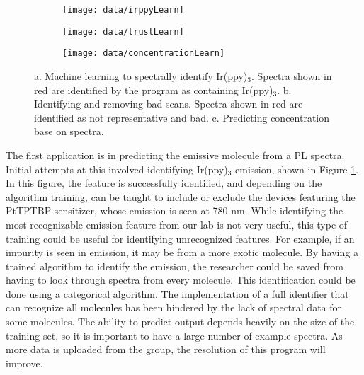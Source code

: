 \documentclass[../thesis.tex]{subfiles}
\begin{document}
\begin{figure}[ht]
\centering
    \begin{subfigure}{.3\textwidth}
    \texttt{[image: data/irppyLearn]}
    \caption{}
    \label{fig:data_ml_irppy}\par\vfill
    \end{subfigure}
    \begin{subfigure}{.3\textwidth}
    \texttt{[image: data/trustLearn]}
    \caption{}
    \label{fig:data_ml_trust}\par\vfill
    \end{subfigure}
    \begin{subfigure}{.3\textwidth}
    \texttt{[image: data/concentrationLearn]}
    \caption{}
    \label{fig:data_ml_concentration}\par\vfill
    \end{subfigure}
\caption{  a. Machine learning to spectrally identify Ir(ppy)$_3$.  Spectra shown in red are identified by the program as containing Ir(ppy)$_3$. b. Identifying and removing bad \eqe scans.  Spectra shown in red are identified as not representative and bad.  c. Predicting concentration base on spectra.}
\end{figure}

The first application is in predicting the emissive molecule from a PL spectra.
Initial attempts at this involved identifying Ir(ppy)$_3$ emission, shown in Figure \ref{fig:data_ml_irppy}.
In this figure, the \irppy feature is successfully identified, and depending on the algorithm training, can be taught to include or exclude the devices featuring the PtTPTBP sensitizer, whose emission is seen at 780 nm.
While identifying the most recognizable emission feature from our lab is not very useful, this type of training could be useful for identifying unrecognized features.
For example, if an impurity is seen in emission, it may be from a more exotic molecule.  
By having a trained algorithm to identify the emission, the researcher could be saved from having to look through spectra from every molecule.
This identification could be done using a categorical algorithm.
The implementation of a full identifier that can recognize all molecules has been hindered by the lack of spectral data for some molecules.
The ability to predict output depends heavily on the size of the training set, so it is important to have a large number of example spectra.
As more data is uploaded from the group, the resolution of this program will improve.
\end{document}
